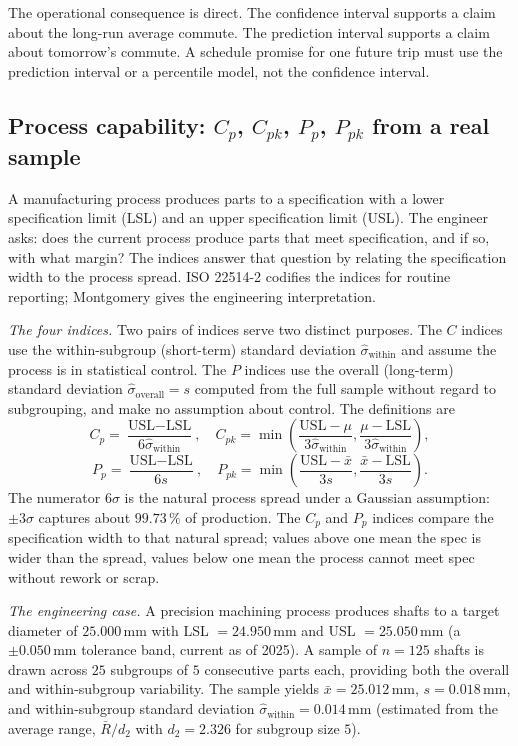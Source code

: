 The operational consequence is direct. The confidence interval
supports a claim about the long-run average commute. The prediction
interval supports a claim about tomorrow's commute. A schedule
promise for one future trip must use the prediction interval or a
percentile model, not the confidence interval.

\subsection{Process capability: \texorpdfstring{$C_{p}$, $C_{pk}$,
$P_{p}$, $P_{pk}$}{Cp, Cpk, Pp, Ppk} from a real sample}

A manufacturing process produces parts to a specification with a
lower specification limit (LSL) and an upper specification limit
(USL). The engineer asks: does the current process produce
parts that meet specification, and if so, with what margin? The
 indices answer that question by
relating the specification width to the process spread. ISO 22514-2
\cite{std:ch08-iso-22514-2-2017} codifies the indices for routine
reporting; Montgomery \cite[ch.~8]{text:ch08-montgomery-spc-2019}
gives the engineering interpretation.

\textit{The four indices.} Two pairs of indices serve two distinct
purposes. The $C$ indices use the within-subgroup (short-term)
standard deviation $\hat{\sigma}_{\text{within}}$ and assume the
process is in statistical control. The $P$ indices use the overall
(long-term) standard deviation $\hat{\sigma}_{\text{overall}} = s$
computed from the full sample without regard to subgrouping, and
make no assumption about control. The definitions are
\[
C_{p} = \frac{\text{USL} - \text{LSL}}{6 \hat{\sigma}_{\text{within}}},
\quad
C_{pk} = \min\!\left(
\frac{\text{USL} - \mu}{3 \hat{\sigma}_{\text{within}}},
\frac{\mu - \text{LSL}}{3 \hat{\sigma}_{\text{within}}}
\right),
\]
\[
P_{p} = \frac{\text{USL} - \text{LSL}}{6 s},
\quad
P_{pk} = \min\!\left(
\frac{\text{USL} - \bar{x}}{3 s},
\frac{\bar{x} - \text{LSL}}{3 s}
\right).
\]
The numerator $6\sigma$ is the natural process spread under a
Gaussian assumption: $\pm 3\sigma$ captures about $99.73 \,\%$ of
production. The $C_{p}$ and $P_{p}$ indices compare the
specification width to that natural spread; values above one mean
the spec is wider than the spread, values below one mean the
process cannot meet spec without rework or scrap.

\textit{The engineering case.} A precision machining process
produces shafts to a target diameter of $25.000 \,\si{\milli\meter}$
with LSL $= 24.950 \,\si{\milli\meter}$ and
USL $= 25.050 \,\si{\milli\meter}$ (a $\pm 0.050 \,\si{\milli\meter}$
tolerance band, current as of 2025). A sample of $n = 125$ shafts is
drawn across $25$ subgroups of $5$ consecutive parts each, providing
both the overall and within-subgroup variability. The sample
yields $\bar{x} = 25.012 \,\si{\milli\meter}$, $s = 0.018
\,\si{\milli\meter}$, and within-subgroup standard deviation
$\hat{\sigma}_{\text{within}} = 0.014 \,\si{\milli\meter}$
(estimated from the average range, $\bar{R}/d_{2}$ with
$d_{2} = 2.326$ for subgroup size $5$).

